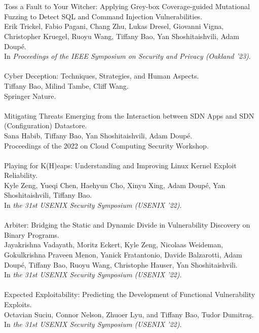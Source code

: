 \documentclass[11pt]{article}
\begin{document}
\\\\
Toss a Fault to Your Witcher: Applying Grey-box Coverage-guided Mutational Fuzzing to Detect SQL and Command Injection Vulnerabilities. \\
Erik Trickel, Fabio Pagani, Chang Zhu, Lukas Dresel, Giovanni Vigna, Christopher Kruegel, Ruoyu Wang, Tiffany Bao, Yan Shoshitaishvili, Adam Doup\'{e}. \\
In \emph{Proceedings of the IEEE Symposium on Security and Privacy (Oakland '23)}.
\\\\
Cyber Deception: Techniques, Strategies, and Human Aspects.\\
Tiffany Bao, Milind Tambe, Cliff Wang.\\
Springer Nature.
\\\\
Mitigating Threats Emerging from the Interaction between SDN Apps and SDN (Configuration) Datastore. \\
Sana Habib, Tiffany Bao, Yan Shoshitaishvili, Adam Doup\'{e}. \\
Proceedings of the 2022 on Cloud Computing Security Workshop.
\\\\
Playing for K(H)eaps: Understanding and Improving Linux Kernel Exploit Reliability. \\
Kyle Zeng, Yueqi Chen, Haehyun Cho, Xinyu Xing, Adam Doupé, Yan Shoshitaishvili, Tiffany Bao. \\
In \emph{the 31st USENIX Security Symposium (USENIX '22)}.
\\\\
Arbiter: Bridging the Static and Dynamic Divide in Vulnerability Discovery on Binary Programs. \\
Jayakrishna Vadayath, Moritz Eckert, Kyle Zeng, Nicolaas Weideman, Gokulkrishna Praveen Menon, Yanick Fratantonio, Davide Balzarotti, Adam Doupé, Tiffany Bao, Ruoyu Wang, Christophe Hauser, Yan Shoshitaishvili. \\
In \emph{the 31st USENIX Security Symposium (USENIX '22)}.
\\\\
Expected Exploitability: Predicting the Development of Functional Vulnerability Exploits. \\
Octavian Suciu, Connor Nelson, Zhuoer Lyu, and Tiffany Bao, Tudor Dumitra\c{s}. \\
In \emph{the 31st USENIX Security Symposium (USENIX '22)}.
\\\\
\end{document}
